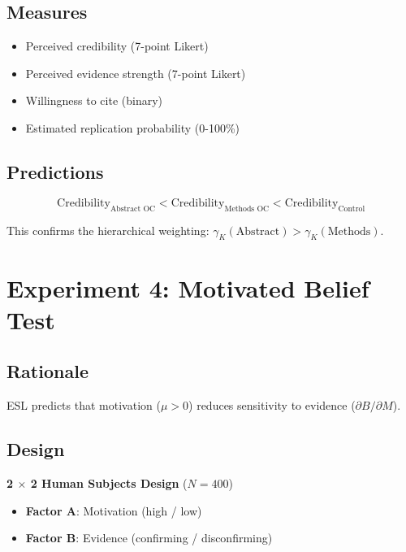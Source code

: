 \documentclass[11pt,a4paper]{article}
\begin{document}
\subsection{Measures}

\begin{itemize}
    \item Perceived credibility (7-point Likert)
    \item Perceived evidence strength (7-point Likert)
    \item Willingness to cite (binary)
    \item Estimated replication probability (0-100\%)
\end{itemize}

\subsection{Predictions}

\begin{equation}
\text{Credibility}_{\text{Abstract OC}} < \text{Credibility}_{\text{Methods OC}} < \text{Credibility}_{\text{Control}}
\end{equation}

This confirms the hierarchical weighting: $\gamma_K(\text{Abstract}) > \gamma_K(\text{Methods})$.


\section{Experiment 4: Motivated Belief Test}

\subsection{Rationale}

ESL predicts that motivation ($\mu > 0$) reduces sensitivity to evidence ($\partial B / \partial M$).

\subsection{Design}

\textbf{2 $\times$ 2 Human Subjects Design} ($N = 400$)
\begin{itemize}
    \item \textbf{Factor A}: Motivation (high / low)
    \item \textbf{Factor B}: Evidence (confirming / disconfirming)
\end{itemize}
\end{document}
